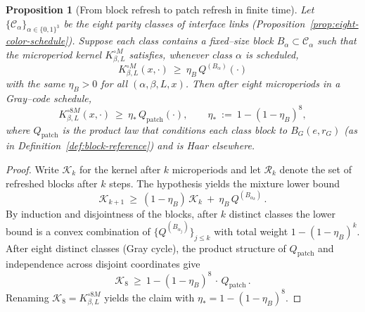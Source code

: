 \documentclass[11pt]{amsart}
\theoremstyle{plain}
\newtheorem{proposition}[theorem]{Proposition}
\theoremstyle{definition}
\theoremstyle{remark}
\begin{document}
\begin{proposition}[From block refresh to patch refresh in finite time]\label{prop:block-to-patch}
Let $\{\mathcal C_\alpha\}_{\alpha\in\{0,1\}^3}$ be the eight parity classes of interface links (Proposition~\ref{prop:eight-color-schedule}). Suppose each class contains a fixed--size block $B_\alpha\subset\mathcal C_\alpha$ such that the microperiod kernel $K_{\beta,L}^{\circ M}$ satisfies, whenever class $\alpha$ is scheduled,
\[
  K_{\beta,L}^{\circ M}(x,\cdot)\ \ge\ \eta_B\, Q^{(B_\alpha)}(\cdot)
\]
with the same $\eta_B>0$ for all $(\alpha,\beta,L,x)$. Then after eight microperiods in a Gray--code schedule,
\[
  K_{\beta,L}^{\circ 8M}(x,\cdot)\ \ge\ \eta_*\, Q_{\mathrm{patch}}(\cdot),\qquad
  \eta_*\ :=\ 1-(1-\eta_B)^8,
\]
where $Q_{\mathrm{patch}}$ is the product law that conditions each class block to $B_G(e,r_G)$ (as in Definition~\ref{def:block-reference}) and is Haar elsewhere.
\end{proposition}
\begin{proof}
Write $\mathcal K_k$ for the kernel after $k$ microperiods and let $\mathcal R_k$ denote the set of refreshed blocks after $k$ steps. The hypothesis yields the mixture lower bound
\[
  \mathcal K_{k+1}\ \ge\ (1-\eta_B)\,\mathcal K_k\ +\ \eta_B\, Q^{(B_{\alpha_k})}\,.
\]
By induction and disjointness of the blocks, after $k$ distinct classes the lower bound is a convex combination of $\{Q^{(B_{\alpha_j})}\}_{j\le k}$ with total weight $1-(1-\eta_B)^k$. After eight distinct classes (Gray cycle), the product structure of $Q_{\mathrm{patch}}$ and independence across disjoint coordinates give
\[
  \mathcal K_{8}\ \ge\ 1-(1-\eta_B)^8\, \cdot\, Q_{\mathrm{patch}}\,.
\]
Renaming $\mathcal K_8=K_{\beta,L}^{\circ 8M}$ yields the claim with $\eta_*=1-(1-\eta_B)^8$.
\end{proof}
\end{document}

